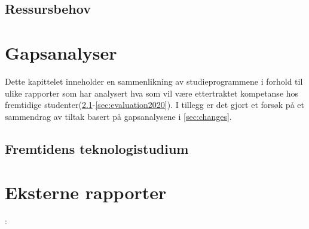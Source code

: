 \documentclass[a4paper, oneside, 12pt]{memoir}
\begin{document}

\section{Ressursbehov}


\chapter{Gapsanalyser}
\label{chap:gap-analysis}

Dette kapittelet inneholder en sammenlikning av studieprogrammene i forhold til ulike rapporter som har analysert hva som vil være ettertraktet kompetanse hos fremtidige studenter(\ref{sec:fts}-\ref{sec:evaluation2020}). I tillegg er det gjort et forsøk på et sammendrag av tiltak basert på gapsanalysene i \ref{sec:changes}.



\section{Fremtidens teknologistudium}
	\label{sec:fts}
	
	



\chapter{Eksterne rapporter}
\label{chap:external-reports}



:




\fi %

\printbibliography


\end{document}
